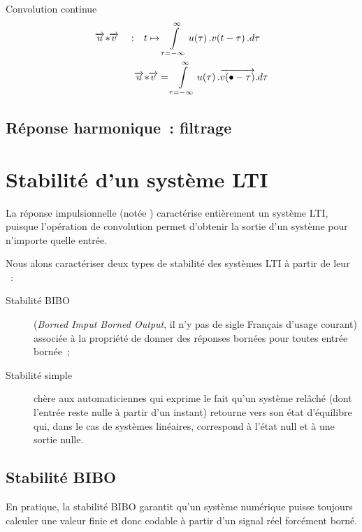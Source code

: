 \begin{definition}{Convolution continue}
  \begin{align}
    \label{eq:convolution_continue}
    \vec{u}\conv\!\vec{v} \quad :& \quad t\mapsto \integ{\tau=-\infty}{\infty}{u\de{\tau}.v\de{t-\tau}.d\tau} \\
    & \vec{u}\conv\!\vec{v} = \integ{\tau=-\infty}{\infty}{u\de{\tau}.\vec{v\de{\bullet-\tau}}.d\tau}
  \end{align} 
\end{definition}


\subsection{Réponse harmonique~: filtrage}



\section{Stabilité d'un système LTI}
\label{sec:stabilite}
La réponse impulsionnelle (notée \RIP) caractérise entièrement un
système LTI, puisque l'opération de convolution permet d'obtenir la
sortie d'un système pour n'importe quelle entrée.

Nous alons caractériser deux types de stabilité des systèmes LTI à
partir de leur \RIP{}~:
\begin{description}
\item[Stabilité BIBO] (\emph{Borned Imput Borned Output}, il n'y pas
  de sigle Français d'usage courant) associée à la propriété de donner
  des réponses bornées pour toutes entrée bornée~;
\item[Stabilité simple] chère aux automaticiennes qui exprime le fait
  qu'un système relâché (dont l'entrée reste nulle à partir d'un
  instant) retourne vers son état d'équilibre qui, dans le cas de
  systèmes linéaires, correspond à l'état null et à une sortie nulle.
\end{description}

\subsection{Stabilité BIBO}

En pratique, la stabilité BIBO garantit qu'un système numérique puisse
toujours calculer une valeur finie et donc codable à partir d'un
signal réel forcément borné.


